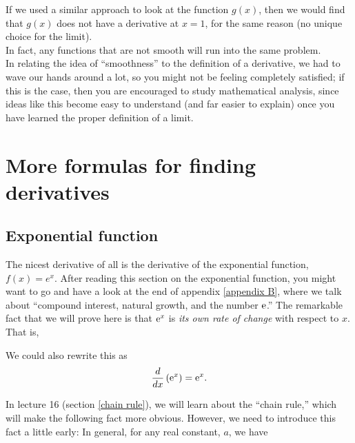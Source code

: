 \noindent If we used a similar approach to look at the function $g(x)$, then we would find that $g(x)$ does not have a derivative at $x = 1$, for the same reason (no unique choice for the limit). \\

\noindent In fact, any functions that are not smooth will run into the same problem. \\

\noindent In relating the idea of ``smoothness'' to the definition of a derivative, we had to wave our hands around a lot, so you might not be feeling completely satisfied; if this is the case, then you are encouraged to study mathematical analysis, since ideas like this become easy to understand (and far easier to explain) once you have learned the proper definition of a limit.

\section{More formulas for finding derivatives} \label{more derivative formulas}

\subsection{Exponential function} \label{derivative of exponential}
The nicest derivative of all is the derivative of the exponential function, $f(x) = e^x$. After 
reading this section on the exponential function, you might want to go and have a look at the end of appendix \ref{appendix B}, where we talk about ``compound interest, natural growth, and the number $\mathrm{e}$.'' The remarkable fact that we will prove here is that $\mathrm{e}^x$ is \textit{its own rate of change} with respect to $x$. That is,
 
  	\bigskip
	
	\hfil{}
	\bigskip
	\bigskip

\noindent We could also rewrite this as
\[
\frac{d}{dx}\left(\mathrm{e}^x\right) = \mathrm{e}^x.
\]

\noindent In lecture 16 (section \ref{chain rule}), we will learn about the ``chain rule,'' which will make the following fact more obvious. However, we need to introduce this fact a little early: In general, for any real constant, $a$, we have
 
